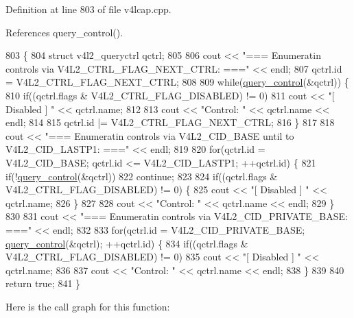 Definition at line 803 of file v4lcap.\+cpp.



References query\+\_\+control().


\begin{DoxyCode}
803                            \{
804     \textcolor{keyword}{struct }v4l2\_queryctrl qctrl;
805 
806     cout << \textcolor{stringliteral}{"=== Enumeratin controls via V4L2\_CTRL\_FLAG\_NEXT\_CTRL: ==="} << endl;
807     qctrl.id = V4L2\_CTRL\_FLAG\_NEXT\_CTRL;
808 
809     \textcolor{keywordflow}{while}(\hyperlink{classv4lcap_acede842207240d9eb3b4a8d99ff32fc4}{query\_control}(&qctrl)) \{
810         \textcolor{keywordflow}{if}((qctrl.flags & V4L2\_CTRL\_FLAG\_DISABLED) != 0)
811             cout << \textcolor{stringliteral}{"[ Disabled ] "} << qctrl.name;
812 
813         cout << \textcolor{stringliteral}{"Control: "} << qctrl.name << endl;
814 
815         qctrl.id |= V4L2\_CTRL\_FLAG\_NEXT\_CTRL;
816     \}
817 
818     cout << \textcolor{stringliteral}{"=== Enumeratin controls via V4L2\_CID\_BASE until to V4L2\_CID\_LASTP1: ==="} << endl;
819 
820     \textcolor{keywordflow}{for}(qctrl.id = V4L2\_CID\_BASE; qctrl.id <= V4L2\_CID\_LASTP1; ++qctrl.id) \{
821         \textcolor{keywordflow}{if}(!\hyperlink{classv4lcap_acede842207240d9eb3b4a8d99ff32fc4}{query\_control}(&qctrl))
822             \textcolor{keywordflow}{continue};
823 
824         \textcolor{keywordflow}{if}((qctrl.flags & V4L2\_CTRL\_FLAG\_DISABLED) != 0) \{
825             cout << \textcolor{stringliteral}{"[ Disabled ] "} << qctrl.name;
826         \}
827 
828         cout << \textcolor{stringliteral}{"Control: "} << qctrl.name << endl;
829     \}
830 
831     cout << \textcolor{stringliteral}{"=== Enumeratin controls via V4L2\_CID\_PRIVATE\_BASE: ==="} << endl;
832 
833     \textcolor{keywordflow}{for}(qctrl.id = V4L2\_CID\_PRIVATE\_BASE; \hyperlink{classv4lcap_acede842207240d9eb3b4a8d99ff32fc4}{query\_control}(&qctrl); ++qctrl.id) \{
834         \textcolor{keywordflow}{if}((qctrl.flags & V4L2\_CTRL\_FLAG\_DISABLED) != 0)
835             cout << \textcolor{stringliteral}{"[ Disabled ] "} << qctrl.name;
836 
837         cout << \textcolor{stringliteral}{"Control: "} << qctrl.name << endl;
838     \}
839 
840     \textcolor{keywordflow}{return} \textcolor{keyword}{true};
841 \}
\end{DoxyCode}
Here is the call graph for this function\+:
\mbox{\label{classv4lcap_a4a7ee51c878ec735c9a24b517c63df16}} 
